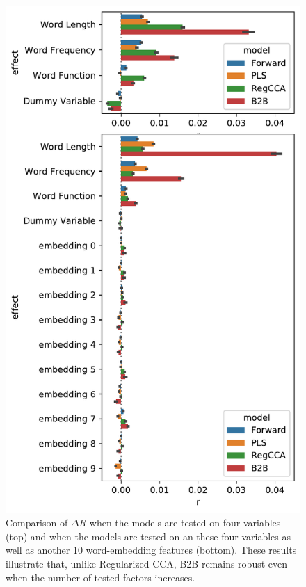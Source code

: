 \begin{figure}
  \centering
  \includegraphics[width=0.5\linewidth]{figures/compare_embeddings.pdf}
  \caption{Comparison of $\Delta R$ when the models are tested on four
  variables (top) and when the models are tested on an these four variables
  as well as another 10 word-embedding features (bottom). These results
  illustrate that, unlike Regularized CCA, B2B remains robust even when
  the number of tested factors increases.
  \label{fig:embeddings}}
\end{figure}
